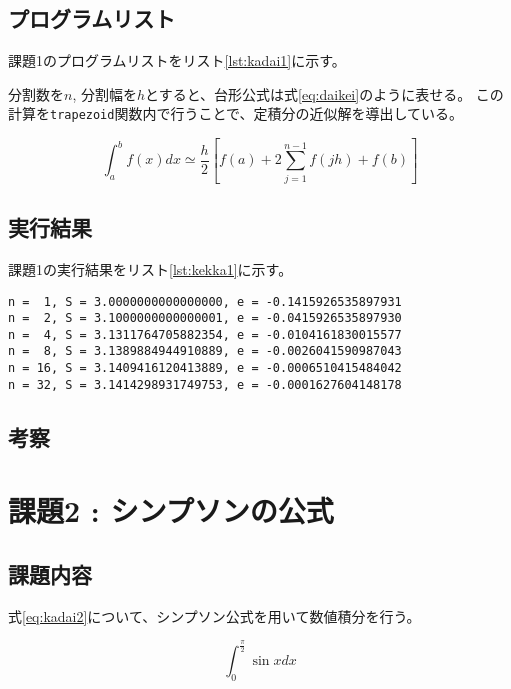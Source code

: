 \documentclass[a4j,titlepage]{jsarticle}
\begin{document}
\subsection{プログラムリスト}
課題1のプログラムリストをリスト\ref{lst:kadai1}に示す。

分割数を$n$, 分割幅を$h$とすると、台形公式は式\ref{eq:daikei}のように表せる。
この計算を\texttt{trapezoid}関数内で行うことで、定積分の近似解を導出している。

\begin{equation}
  \int_a^b f(x) dx \simeq \frac{h}{2} \left[ f(a) + 2 \sum_{j=1}^{n-1} f(jh) + f(b) \right]
  \label{eq:daikei}
\end{equation}



\subsection{実行結果}
課題1の実行結果をリスト\ref{lst:kekka1}に示す。

\begin{lstlisting}[style=text,caption=課題1の実行結果,label=lst:kekka1]
n =  1, S = 3.0000000000000000, e = -0.1415926535897931
n =  2, S = 3.1000000000000001, e = -0.0415926535897930
n =  4, S = 3.1311764705882354, e = -0.0104161830015577
n =  8, S = 3.1389884944910889, e = -0.0026041590987043
n = 16, S = 3.1409416120413889, e = -0.0006510415484042
n = 32, S = 3.1414298931749753, e = -0.0001627604148178
\end{lstlisting}

\subsection{考察}


\section{課題2 : シンプソンの公式}
\subsection{課題内容}
式\ref{eq:kadai2}について、シンプソン公式を用いて数値積分を行う。

\begin{equation}
  \int_0^\frac{\pi}{2} \sin x dx
  \label{eq:kadai2}
\end{equation}
\end{document}
